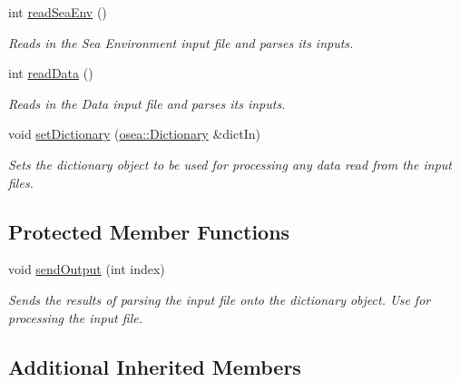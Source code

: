 \begin{DoxyCompactItemize}
int \hyperlink{classosea_1_1_file_reader_a1f8a6bd4b5c53f80cc94d64d6dd1f2da}{read\-Sea\-Env} ()
\begin{DoxyCompactList}\small\item\em Reads in the Sea Environment input file and parses its inputs. \end{DoxyCompactList}\item 
int \hyperlink{classosea_1_1_file_reader_a814f8b06adcc190d4042509797eef6d2}{read\-Data} ()
\begin{DoxyCompactList}\small\item\em Reads in the Data input file and parses its inputs. \end{DoxyCompactList}\item 
void \hyperlink{classosea_1_1_file_reader_a3cbdb7eab632abafcfd055aa92f47b73}{set\-Dictionary} (\hyperlink{classosea_1_1_dictionary}{osea\-::\-Dictionary} \&dict\-In)
\begin{DoxyCompactList}\small\item\em Sets the dictionary object to be used for processing any data read from the input files. \end{DoxyCompactList}\end{DoxyCompactItemize}
\subsection*{Protected Member Functions}
\begin{DoxyCompactItemize}
\item 
void \hyperlink{classosea_1_1_file_reader_aa57b483154b47ad0126d97debb53c638}{send\-Output} (int index)
\begin{DoxyCompactList}\small\item\em Sends the results of parsing the input file onto the dictionary object. Use for processing the input file. \end{DoxyCompactList}\end{DoxyCompactItemize}
\subsection*{Additional Inherited Members}


